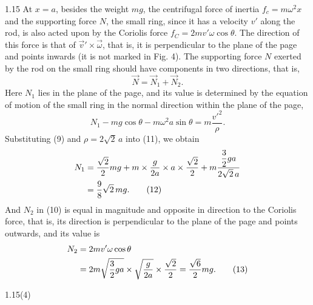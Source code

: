 \begin{solution}{1.15}
At $x=a$, besides the weight $mg$, the centrifugal force of inertia $f_c=m\omega^2x$ and the supporting force $N$, the small ring, since it has a velocity $v'$ along the rod, is also acted upon by the Coriolis force $f_C=2mv'\omega\cos\theta$. The direction of this force is that of $\vec{v}'\times\vec{\omega}$, that is, it is perpendicular to the plane of the page and points inwards (it is not marked in Fig. 4). The supporting force $N$ exerted by the rod on the small ring should have components in two directions, that is,
\begin{equation}
\vec{N}=\vec{N}_1+\vec{N}_2. \tag{10}
\end{equation}
Here $N_1$ lies in the plane of the page, and its value is determined by the equation of motion of the small ring in the normal direction within the plane of the page,
\begin{equation}
N_1-mg\cos\theta-m\omega^2a\sin\theta=m\frac{v'^2}{\rho}. \tag{11}
\end{equation}
Substituting (9) and $\rho=2\sqrt{2}\,a$ into (11), we obtain
\begin{align}
N_1&=\frac{\sqrt{2}}{2}mg+m\times\frac{g}{2a}\times a\times\frac{\sqrt{2}}{2}+m\frac{\dfrac{3}{2}ga}{2\sqrt{2}\,a}\notag\\
&=\frac{9}{8}\sqrt{2}\,mg. \tag{12}
\end{align}
And $N_2$ in (10) is equal in magnitude and opposite in direction to the Coriolis force, that is, its direction is perpendicular to the plane of the page and points outwards, and its value is
\begin{align}
N_2&=2mv'\omega\cos\theta\notag\\
&=2m\sqrt{\frac{3}{2}ga}\times\sqrt{\frac{g}{2a}}\times\frac{\sqrt{2}}{2}=\frac{\sqrt{6}}{2}mg. \tag{13}
\end{align}

\begin{figbox}{1.15(4)}
\end{figbox}


\end{solution}
